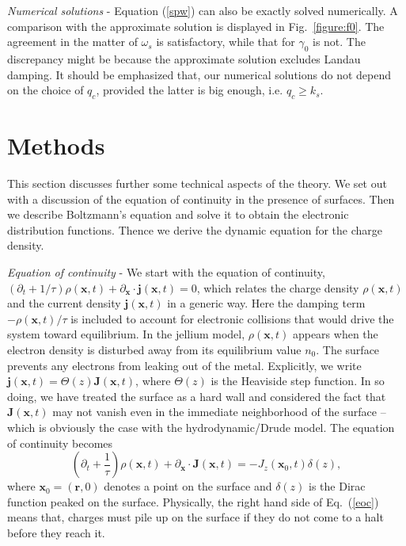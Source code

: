 \documentclass[aps,reprint]{revtex4-1}
\begin{document}
\textit{Numerical solutions} - Equation (\ref{spw}) can also be exactly solved numerically. A comparison with the approximate solution is displayed in Fig.~\ref{figure:f0}. The agreement in the matter of $\omega_s$ is satisfactory, while that for $\gamma_0$ is not. The discrepancy might be because the approximate solution excludes Landau damping. It should be emphasized that, our numerical solutions do not depend on the choice of $q_c$, provided the latter is big enough, i.e. $q_c\geq k_s$. 
 
\section{Methods}
\label{sec:3}
This section discusses further some technical aspects of the theory. We set out with a discussion of the equation of continuity in the presence of surfaces. Then we describe Boltzmann's equation and solve it to obtain the electronic distribution functions. Thence we derive the dynamic equation for the charge density. 

\textit{Equation of continuity} - We start with the equation of continuity, $\left(\partial_t+1/\tau\right)\rho(\mathbf{x},t)+\partial_{\mathbf{x}}\cdot\mathbf{j}(\mathbf{x},t)=0$, which relates the charge density $\rho(\mathbf{x},t)$ and the current density $\mathbf{j}(\mathbf{x},t)$ in a generic way. Here the damping term $-\rho(\mathbf{x},t)/\tau$ is included to account for electronic collisions that would drive the system toward equilibrium. In the jellium model, $\rho(\mathbf{x},t)$ appears when the electron density is disturbed away from its equilibrium value $n_0$. The surface  prevents any electrons from leaking out of the metal. Explicitly, we write $\mathbf{j}(\mathbf{x},t) = \Theta(z)\mathbf{J}(\mathbf{x},t)$, where $\Theta(z)$ is the Heaviside step function. In so doing, we have treated the surface as a hard wall and considered the fact that $\mathbf{J}(\mathbf{x},t)$ may not vanish even in the immediate neighborhood of the surface -- which is obviously the case with the hydrodynamic/Drude model. The equation of continuity becomes
\begin{equation}
\left(\partial_t+\frac{1}{\tau}\right)\rho(\mathbf{x},t)+\partial_{\mathbf{x}}\cdot\mathbf{J}(\mathbf{x},t) = -J_z(\mathbf{x}_0,t)\delta(z), \label{eoc}
\end{equation} 
where $\mathbf{x}_0 = (\mathbf{r},0)$ denotes a point on the surface and $\delta(z)$ is the Dirac function peaked on the surface. Physically, the right hand side of Eq.~(\ref{eoc}) means that, charges must pile up on the surface if they do not come to a halt before they reach it. 
\end{document}
